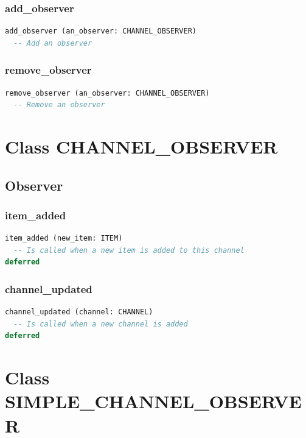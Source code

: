 \subsubsection{add\_observer}

\begin{lstlisting}[language=Eiffel]
add_observer (an_observer: CHANNEL_OBSERVER)
  -- Add an observer
\end{lstlisting}

\subsubsection{remove\_observer}

\begin{lstlisting}[language=Eiffel]
remove_observer (an_observer: CHANNEL_OBSERVER)
  -- Remove an observer
\end{lstlisting}


\section{Class CHANNEL\_OBSERVER}
\label{sec:feed-observer}

\subsection{Observer}
\label{sec:feed-channel-observer-observer}

\subsubsection{item\_added}

\begin{lstlisting}[language=Eiffel]
item_added (new_item: ITEM)
  -- Is called when a new item is added to this channel
deferred
\end{lstlisting}

\subsubsection{channel\_updated}

\begin{lstlisting}[language=Eiffel]
channel_updated (channel: CHANNEL)
  -- Is called when a new channel is added
deferred
\end{lstlisting}


\section{Class SIMPLE\_CHANNEL\_OBSERVER}
\label{sec:feed-channel-observer}

